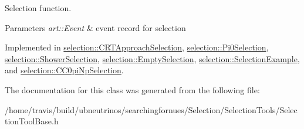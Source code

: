 Selection function. 


\begin{DoxyParams}{Parameters}
{\em art\-::\-Event} & event record for selection \\
\hline
\end{DoxyParams}


Implemented in \hyperlink{classselection_1_1CRTApproachSelection_a9dffc74d919ac0586d57c1de740f4ce9}{selection\-::\-C\-R\-T\-Approach\-Selection}, \hyperlink{classselection_1_1Pi0Selection_a1efba82b7ec3c2e18a48a98605720009}{selection\-::\-Pi0\-Selection}, \hyperlink{classselection_1_1ShowerSelection_aa538b905ab6e8a329acf3eaa97cc0af9}{selection\-::\-Shower\-Selection}, \hyperlink{classselection_1_1EmptySelection_a4ecce282e53d9d7c6c4764eef0b808f7}{selection\-::\-Empty\-Selection}, \hyperlink{classselection_1_1SelectionExample_a25a0971c86e5b6fb2ce51c16c0a58f9e}{selection\-::\-Selection\-Example}, and \hyperlink{classselection_1_1CC0piNpSelection_aee88d296a2ebad59acadfd919139d96f}{selection\-::\-C\-C0pi\-Np\-Selection}.



The documentation for this class was generated from the following file\-:\begin{DoxyCompactItemize}
\item 
/home/travis/build/ubneutrinos/searchingfornues/\-Selection/\-Selection\-Tools/Selection\-Tool\-Base.\-h\end{DoxyCompactItemize}
